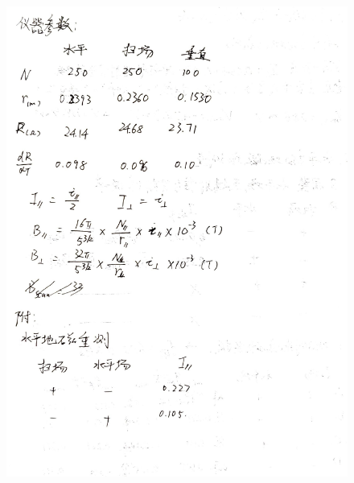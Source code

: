 \documentclass[10pt,hyperref,a4paper,UTF8]{ctexart}
\begin{document}
\begin{figure}[thbp!]
\begin{minipage}[t]{0.49\linewidth}
            \includegraphics[width=\linewidth]{figures/appedix2.jpg}
        \end{minipage}


\end{figure}
\end{document}
